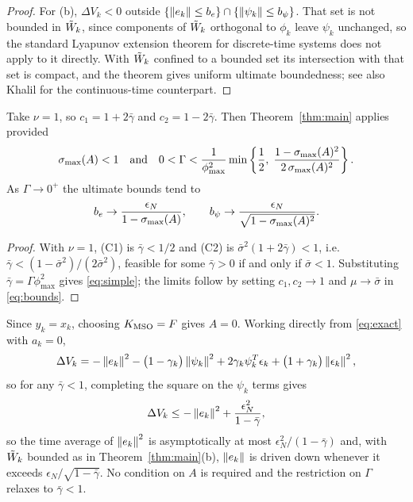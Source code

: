 \begin{proof}
For (b), $\Delta V_k<0$ outside
$\{\left\lVert e_k \right\rVert\le b_e\}\cap\{\left\lVert \psi_k \right\rVert\le b_\psi\}$. That set is not
bounded in $\tilde{W}_k$, since components of $\tilde{W}_k$ orthogonal to $\phi_k$ leave
$\psi_k$ unchanged, so the standard Lyapunov extension theorem for
discrete-time systems \cite{lewis1999neural,jagannathan2006neural} does not apply
to it directly. With $\tilde{W}_k$ confined to a bounded set its intersection with
that set is compact, and the theorem gives uniform ultimate boundedness; see also
Khalil \cite{khalil2002nonlinear} for the continuous-time counterpart.
\end{proof}

\begin{corollary}\label{cor:theta1}
Take $\nu=1$, so $c_1=1+2\bar\gamma$ and $c_2=1-2\bar\gamma$. Then
Theorem~\ref{thm:main} applies provided
\begin{equation}\label{eq:simple}
\sigma_{\max}(A)<1
\quad\text{and}\quad
0<\Gamma<\frac{1}{\phi_{\max}^2}
\min\left\{\frac{1}{2},\;
\frac{1-\sigma_{\max}(A)^2}{2\,\sigma_{\max}(A)^2}\right\}.
\end{equation}
As $\Gamma\to0^+$ the ultimate bounds tend to
\begin{equation}\label{eq:limbounds}
b_e\to\frac{\epsilon_N}{1-\sigma_{\max}(A)},\qquad
b_\psi\to\frac{\epsilon_N}{\sqrt{1-\sigma_{\max}(A)^2}} .
\end{equation}
\end{corollary}

\begin{proof}
With $\nu=1$, (C1) is $\bar\gamma<1/2$ and (C2) is
$\bar\sigma^2(1+2\bar\gamma)<1$, i.e.\
$\bar\gamma<(1-\bar\sigma^2)/(2\bar\sigma^2)$, feasible for some
$\bar\gamma>0$ if and only if $\bar\sigma<1$. Substituting
$\bar\gamma=\Gamma\phi_{\max}^2$ gives \eqref{eq:simple}; the limits follow by
setting $c_1,c_2\to1$ and $\mu\to\bar\sigma$ in \eqref{eq:bounds}.
\end{proof}

\begin{corollary}\label{cor:deadbeat}
Since $y_k=x_k$, choosing $K_{\mathrm{MSO}}=F$ gives $A=0$. Working directly from
\eqref{eq:exact} with $a_k=0$,
\[
\Delta V_k=-\left\lVert e_k \right\rVert^2-\bigl(1-\gamma_k\bigr)\left\lVert \psi_k \right\rVert^2
+2\gamma_k\psi_k^T\epsilon_k+\bigl(1+\gamma_k\bigr)\left\lVert \epsilon_k \right\rVert^2 ,
\]
so for any $\bar\gamma<1$, completing the square on the $\psi_k$ terms gives
\[
\Delta V_k\le-\left\lVert e_k \right\rVert^2+\frac{\epsilon_N^2}{1-\bar\gamma},
\]
so the time average of $\left\lVert e_k \right\rVert^2$ is asymptotically at most
$\epsilon_N^2/(1-\bar\gamma)$ and, with $\tilde{W}_k$ bounded as in
Theorem~\ref{thm:main}(b), $\left\lVert e_k \right\rVert$ is driven down whenever it exceeds
$\epsilon_N/\sqrt{1-\bar\gamma}$. No
condition on $A$ is required and the restriction on $\Gamma$ relaxes to
$\bar\gamma<1$.
\end{corollary}

